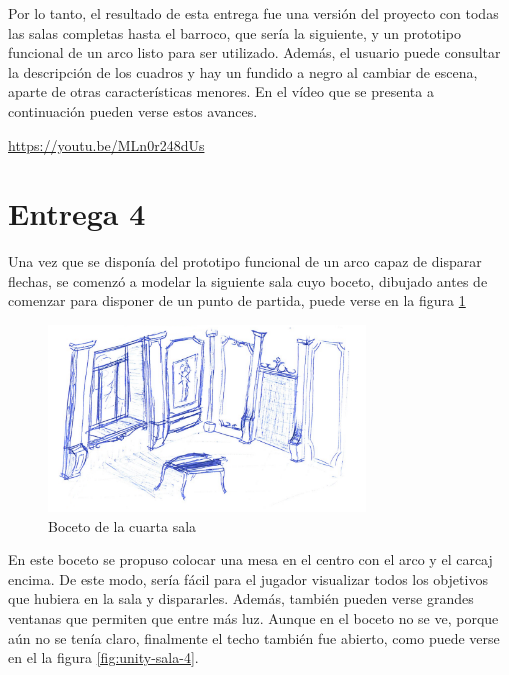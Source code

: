Por lo tanto, el resultado de esta entrega fue una versión del proyecto con todas las salas completas hasta el barroco, que sería la siguiente, y un prototipo funcional de un arco listo para ser utilizado. Además, el usuario puede consultar la descripción de los cuadros y hay un fundido a negro al cambiar de escena, aparte de otras características menores. En el vídeo que se presenta a continuación pueden verse estos avances.

\begin{center}
    \url{https://youtu.be/MLn0r248dUs}
\end{center}



\section{Entrega 4}

Una vez que se disponía del prototipo funcional de un arco capaz de disparar flechas, se comenzó a modelar la siguiente sala cuyo boceto, dibujado antes de comenzar para disponer de un punto de partida, puede verse en la figura \ref{fig:boceto-sala-4}

\begin{figure}[!h]
\begin{center}
\includegraphics[width=0.75\textwidth]{imagenes/7/bocetos/boceto-sala-4.png}
\caption{Boceto de la cuarta sala}
\label{fig:boceto-sala-4}
\end{center}
\end{figure}

En este boceto se propuso colocar una mesa en el centro con el arco y el carcaj encima. De este modo, sería fácil para el jugador visualizar todos los objetivos que hubiera en la sala y dispararles. Además, también pueden verse grandes ventanas que permiten que entre más luz. Aunque en el boceto no se ve, porque aún no se tenía claro, finalmente el techo también fue abierto, como puede verse en el la figura \ref{fig:unity-sala-4}.

